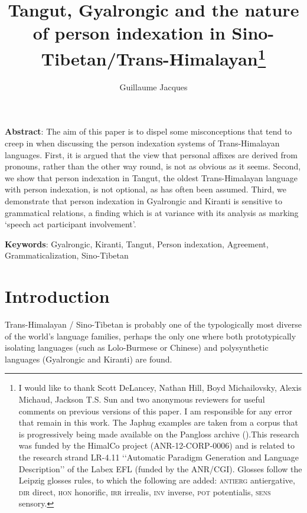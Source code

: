\documentclass[oldfontcommands,oneside,a4paper,11pt]{article}
\begin{document}
 
\title{Tangut, Gyalrongic and the nature of person indexation in Sino-Tibetan/Trans-Himalayan\footnote{I would like to thank Scott DeLancey, Nathan Hill, Boyd Michailovsky, Alexis Michaud, Jackson T.S. Sun and two anonymous reviewers for useful comments on previous versions of this paper. I am responsible for any error that remain in this work. The Japhug examples are taken from a corpus that is progressively being made available on the Pangloss archive (\citealt{michailovsky14pangloss}).This research was funded by the HimalCo project (ANR-12-CORP-0006) and is related to the research strand LR-4.11 ‘‘Automatic Paradigm Generation and Language Description’’ of the Labex EFL (funded by the ANR/CGI). Glosses follow the Leipzig glosses rules, to which the following are added: \textsc{antierg} antiergative, \textsc{dir} direct, \textsc{hon} honorific, \textsc{irr} irrealis, \textsc{inv} inverse, \textsc{pot} potentialis, \textsc{sens} sensory.}}
\author{Guillaume Jacques}
\maketitle

\textbf{Abstract}: The aim of this paper is to dispel some misconceptions that tend to creep in when discussing  the person indexation systems of Trans-Himalayan languages. First, it is argued that the view that personal affixes are derived from pronouns, rather than the other way round, is not as obvious as it seems. Second, we show that person indexation in Tangut, the oldest Trans-Himalayan language with person indexation, is not optional, as has often been assumed. Third, we demonstrate that person indexation in Gyalrongic and Kiranti is sensitive to grammatical relations, a finding which is at variance with its analysis as marking `speech act participant involvement'.

\textbf{Keywords}: Gyalrongic, Kiranti, Tangut, Person indexation, Agreement, Grammaticalization, Sino-Tibetan

\section{Introduction}
Trans-Himalayan / Sino-Tibetan is probably one of the typologically most diverse of the world's language families, perhaps the only one where both prototypically isolating languages (such as Lolo-Burmese or Chinese) and polysynthetic languages (Gyalrongic and Kiranti) are found. 
\end{document}
